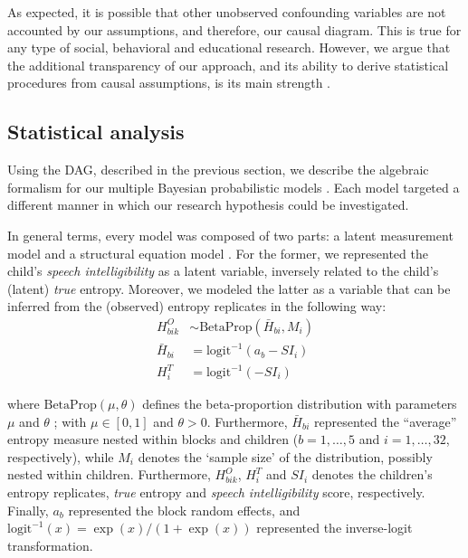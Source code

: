 As expected, it is possible that other unobserved confounding variables are not accounted by our assumptions, and therefore, our causal diagram. This is true for any type of social, behavioral and educational research. However, we argue that the additional transparency of our approach, and its ability to derive statistical procedures from causal assumptions, is its main strength \cite{McElreath_2020, Yarkoni_2020, Rohrer_et_al_2021}.
%
%
\subsection{Statistical analysis} \label{sS:stat_analysis}
%
Using the DAG, described in the previous section, we describe the algebraic formalism for our multiple Bayesian probabilistic models \cite{Jaynes_2003}. Each model targeted a different manner in which our research hypothesis could be investigated.

In general terms, every model was composed of two parts: a latent measurement model \cite{Everitt_1984} and a structural equation model \cite{Hoyle_et_al_2014}. For the former, we represented the child's \textit{speech intelligibility} as a latent variable, inversely related to the child's (latent) \textit{true} entropy. Moreover, we modeled the latter as a variable that can be inferred from the (observed) entropy replicates in the following way:
%
\begin{align}
	H^{O}_{bik} & \sim \text{BetaProp} \left( \bar{H}_{bi}, M_{i} \right) \\ 
	\bar{H}_{bi} &= \text{logit}^{-1}( a_{b} -SI_{i} ) \\
	H^{T}_{i} &= \text{logit}^{-1}( -SI_{i} )
\end{align} 

\noindent where $\text{BetaProp}(\mu, \theta)$ defines the beta-proportion distribution with parameters $\mu$ and $\theta$ \cite{Figueroa-Zuniga_et_al_2013, Kruschke_2015}; with $\mu \in [0,1]$ and $\theta>0$. Furthermore, $\bar{H}_{bi}$ represented the ``average'' entropy measure nested within blocks and children ($b=1,\dots,5$ and $i=1,\dots,32$, respectively), while $M_{i}$ denotes the `sample size' of the distribution, possibly nested within children. Furthermore, $H^{O}_{bik}$, $H^{T}_{i}$ and $SI_{i}$ denotes the children's entropy replicates, \textit{true} entropy and \textit{speech intelligibility} score, respectively. Finally, $a_{b}$ represented the block random effects, and $\text{logit}^{-1}(x) = \exp(x) / ( 1 + \exp(x) )$ represented the inverse-logit transformation. 

